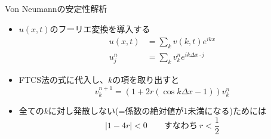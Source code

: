 \begin{frame}[t]{Von Neumannの安定性解析}
  \begin{itemize}
  \item $u(x,t)$のフーリエ変換を導入する
    \begin{align*}
    u(x,t) &= \sum_k v(k,t) e^{ikx} \\
    u_j^n &= \sum_k v_k^n e^{ik\Delta x \cdot j}
    \end{align*}
  \item FTCS法の式に代入し、$k$の項を取り出すと
    \[
    v_{k}^{n+1} =  (1 + 2r(\cos k \Delta x - 1)) v_{k}^{n}
    \]
  \item 全ての$k$に対し発散しない(=係数の絶対値が1未満になる)ためには
    \[
      | 1 - 4r | < 0 \qquad \text{すなわち} \ r < \frac{1}{2}
    \]
  \end{itemize}
\end{frame}
